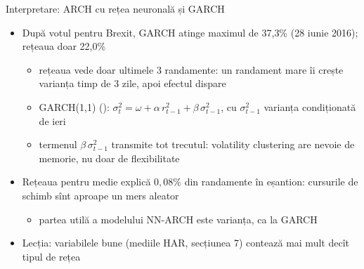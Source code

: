 \begin{frame}{Interpretare: ARCH cu rețea neuronală și GARCH}
\itemsize{\small}
\begin{itemize}
    \item După votul pentru Brexit, GARCH atinge maximul de 37{,}3\% (28 iunie 2016); rețeaua doar 22{,}0\%
    \begin{itemize}
        \item rețeaua vede doar ultimele 3 randamente: un randament mare îi crește varianța timp de 3 zile, apoi efectul dispare
        \item GARCH(1,1) (): $\sigma_t^2 = \omega + \alpha\,r_{t-1}^2 + \beta\,\sigma_{t-1}^2$, cu $\sigma_{t-1}^2$ varianța condiționată de ieri
        \item termenul $\beta\,\sigma_{t-1}^2$ transmite tot trecutul: volatility clustering are nevoie de memorie, nu doar de flexibilitate
    \end{itemize}
    \item Rețeaua pentru medie explică $0{,}08\%$ din randamente în eșantion: cursurile de schimb sînt aproape un mers aleator
    \begin{itemize}
        \item partea utilă a modelului NN-ARCH este varianța, ca la GARCH
    \end{itemize}
    \item Lecția: variabilele bune (mediile HAR, secțiunea 7) contează mai mult decît tipul de rețea
\end{itemize}
\end{frame}

